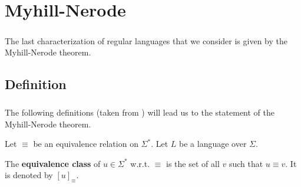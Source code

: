 
\chapter{Myhill-Nerode}

\paragraph{}

The last characterization of regular languages that we consider is given by the Myhill-Nerode theorem.

\section{Definition}

\paragraph{}

The following definitions (taken from \cite{DBLP:books/daglib/0088160}) will lead us to the statement of the Myhill-Nerode theorem.

    Let $\equiv$ be an equivalence relation on $\Sigma^*$. Let $L$ be a language over $\Sigma$.

\begin{definition}
    The \textbf{equivalence class} of $u \in \Sigma^*$ w.r.t. $\equiv$ is the set of all $v$ such that $u \equiv v$.
    It is denoted by $[u]_\equiv$.

\end{definition}
    
